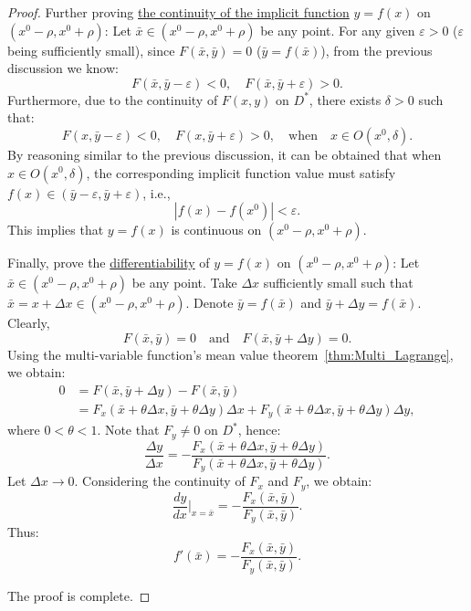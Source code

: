 \documentclass[11pt]{../../TexTemplate/elegantbook}
\begin{document}
\begin{proof}
    Further proving \underline{the continuity of the implicit function} \(y = f(x)\) on \((x^{0} - \rho, x^{0} + \rho)\):  
    Let \(\bar{x} \in (x^{0} - \rho, x^{0} + \rho)\) be any point. 
    For any given \(\varepsilon > 0\) (\(\varepsilon\) being sufficiently small), 
    since \(F(\bar{x}, \bar{y}) = 0\) (\(\bar{y} = f(\bar{x})\)), from the previous discussion we know:  
    \[
    F(\bar{x}, \bar{y} - \varepsilon) < 0, \quad F(\bar{x}, \bar{y} + \varepsilon) > 0.
    \]
    Furthermore, due to the continuity of \(F(x, y)\) on \(D^*\), there exists \(\delta > 0\) such that:  
    \[
    F(x, \bar{y} - \varepsilon) < 0, \quad F(x, \bar{y} + \varepsilon) > 0, \quad \text{when} \quad x \in O(x^{0}, \delta).
    \]
    By reasoning similar to the previous discussion, 
    it can be obtained that when \(x \in O(x^{0}, \delta)\), 
    the corresponding implicit function value must satisfy \(f(x) \in (\bar{y} - \varepsilon, \bar{y} + \varepsilon)\), i.e.,  
    \[
    \left|f(x) - f(x^{0})\right| < \varepsilon.
    \]
    This implies that \(y = f(x)\) is continuous on \((x^{0} - \rho, x^{0} + \rho)\).  

    Finally, prove the \underline{differentiability} of \(y = f(x)\) on \((x^{0} - \rho, x^{0} + \rho)\):  
    Let \(\bar{x} \in (x^{0} - \rho, x^{0} + \rho)\) be any point. 
    Take \(\Delta x\) sufficiently small such that \(\bar{x} = x + \Delta x \in (x^{0} - \rho, x^{0} + \rho)\). 
    Denote \(\bar{y} = f(\bar{x})\) and \(\bar{y} + \Delta y = f(\bar{x})\). Clearly,  
    \[
    F(\bar{x}, \bar{y}) = 0 \quad \text{and} \quad F(\bar{x}, \bar{y} + \Delta y) = 0.
    \]
    Using the multi-variable function's mean value theorem~\ref{thm:Multi_Lagrange}, we obtain:  
    \begin{align*}
        0   &= F(\bar{x}, \bar{y} + \Delta y) - F(\bar{x}, \bar{y}) \\
            &= F_x(\bar{x} + \theta \Delta x, \bar{y} + \theta \Delta y) \Delta x + F_y(\bar{x} + \theta \Delta x, \bar{y} + \theta \Delta y) \Delta y,
    \end{align*}
    where \(0 < \theta < 1\).  
    Note that \(F_y \neq 0\) on \(D^*\), hence:  
    \[
    \frac{\Delta y}{\Delta x} = 
        -\frac{F_x(\bar{x} + \theta \Delta x, \bar{y} + \theta \Delta y)}{F_y(\bar{x} + \theta \Delta x, \bar{y} + \theta \Delta y)}.
    \]
    Let \(\Delta x \to 0\). Considering the continuity of \(F_x\) and \(F_y\), we obtain:  
    \[
    \frac{dy}{dx} \Big|_{x = \bar{x}} = -\frac{F_x(\bar{x}, \bar{y})}{F_y(\bar{x}, \bar{y})}.
    \]
    Thus:  
    \[
    f'(\bar{x}) = -\frac{F_x(\bar{x}, \bar{y})}{F_y(\bar{x}, \bar{y})}.
    \]

    The proof is complete.
\end{proof}
\end{document}
